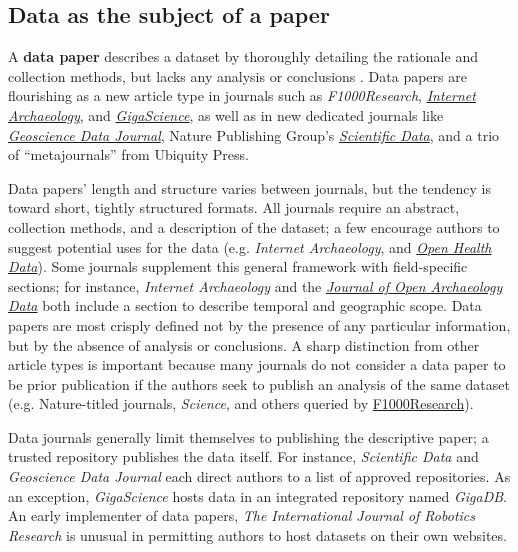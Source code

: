 \documentclass[10pt,twocolumn]{article}
\begin{document}
\subsection*{Data as the subject of a paper}\label{paper-subject-data}

A \textbf{data paper} describes a dataset by thoroughly detailing the rationale and collection methods, but lacks any analysis or conclusions \cite{newman_data_2009}.
Data papers are flourishing as a new article type in journals such as \emph{F1000Research}, \href{http://www.internetarchaeology.org/}{\emph{Internet Archaeology}}, and \href{http://www.gigasciencejournal.com/}{\emph{GigaScience}}\cite{gigascience}, as well as in new dedicated journals like \href{http://onlinelibrary.wiley.com/journal/10.1002/%28ISSN%292049-6060}{\emph{Geoscience Data Journal}}\cite{geoscience_data_journal}, Nature Publishing Group's \href{http://www.nature.com/scientificdata/}{\emph{Scientific Data}}, and a trio of ``metajournals'' from Ubiquity Press.

Data papers' length and structure varies between journals, but the tendency is toward short, tightly structured formats.
All journals require an abstract, collection methods, and a description of the dataset; a few encourage authors to suggest potential uses for the data (e.g. \emph{Internet Archaeology}, and \href{http://openhealthdata.metajnl.com/about/submissions#authorGuidelines}{\emph{Open Health Data}}).
Some journals supplement this general framework with field-specific sections; for instance, \emph{Internet Archaeology} and the \href{http://openarchaeologydata.metajnl.com/}{\emph{Journal of Open Archaeology Data}} both include a section to describe temporal and geographic scope.
Data papers are most crisply defined not by the presence of any particular information, but by the absence of analysis or conclusions.
A sharp distinction from other article types is important because many journals do not consider a data paper to be prior publication if the authors seek to publish an analysis of the same dataset (e.g. Nature-titled journals, \emph{Science}, and others queried by \href{https://f1000research.com/data-policies}{F1000Research}).

Data journals generally limit themselves to publishing the descriptive paper; a trusted repository publishes the data itself.
For instance, \emph{Scientific Data} and \emph{Geoscience Data Journal} each direct authors to a list of approved repositories.
As an exception, \emph{GigaScience} hosts data in an integrated repository named \emph{GigaDB}.
An early implementer of data papers, \emph{The International Journal of Robotics Research}\cite{international_journal_of_robotics_research}\cite{newman_data_2009} is unusual in permitting authors to host datasets on their own websites.
\end{document}
